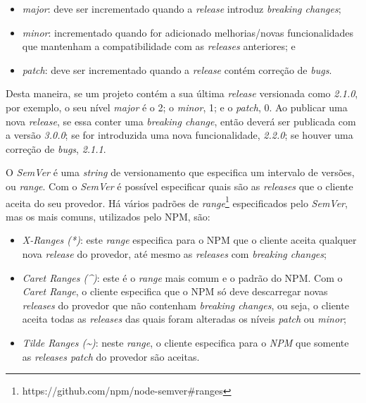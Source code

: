 \begin{itemize}
    \item \textit{major}: deve ser incrementado quando a \textit{release} introduz \textit{breaking changes};
    \item \textit{minor}: incrementado quando for adicionado melhorias/novas funcionalidades que mantenham a compatibilidade com as \textit{releases} anteriores; e
    \item \textit{patch}: deve ser incrementado quando a \textit{release} contém correção de \textit{bugs}.
\end{itemize}{}

Desta maneira, se um projeto contém a sua última \textit{release} versionada como \textit{2.1.0}, por exemplo, o seu nível \textit{major} é o 2; o \textit{minor}, 1; e o \textit{patch}, 0. Ao publicar uma nova \textit{release}, se essa conter uma \textit{breaking change}, então deverá ser publicada com a versão \textit{3.0.0}; se for introduzida uma nova funcionalidade, \textit{2.2.0}; se houver uma correção de \textit{bugs}, \textit{2.1.1}.

O \textit{SemVer} é uma \textit{string} de versionamento que especifica um intervalo de versões, ou \textit{range}. Com o \textit{SemVer} é possível especificar quais são as \textit{releases} que o cliente aceita do seu provedor. Há vários padrões de \textit{range}\footnote{https://github.com/npm/node-semver\#ranges} especificados pelo \textit{SemVer}, mas os mais comuns, utilizados pelo \gls{NPM}, são:

\begin{itemize}
    \item \textit{X-Ranges (*)}: este \textit{range} especifica para o \gls{NPM} que o cliente aceita qualquer nova \textit{release} do provedor, até mesmo as \textit{releases} com \textit{breaking changes};
    \item \textit{Caret Ranges (\textasciicircum)}: este é o \textit{range} mais comum e o padrão do \gls{NPM}. Com o \textit{Caret Range}, o cliente especifica que o \gls{NPM} só deve descarregar novas \textit{releases} do provedor que não contenham \textit{breaking changes}, ou seja, o cliente aceita todas as \textit{releases} das quais foram alteradas os níveis \textit{patch} ou \textit{minor};
    \item \textit{Tilde Ranges (\textasciitilde)}: neste \textit{range}, o cliente especifica para o \textit{NPM} que somente as \textit{releases patch} do provedor são aceitas.
\end{itemize}{}

